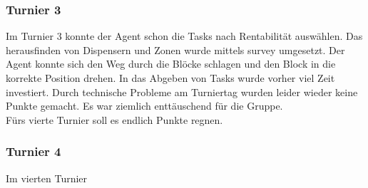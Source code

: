 %
%

\subsubsection{Turnier 3}
Im Turnier 3 konnte der Agent schon die Tasks nach Rentabilität auswählen. Das herausfinden von Dispensern und Zonen wurde mittels survey umgesetzt. Der Agent konnte sich den Weg durch die Blöcke schlagen und den Block in die korrekte Position drehen. In das Abgeben von Tasks wurde vorher viel Zeit investiert. Durch technische Probleme am Turniertag wurden leider wieder keine Punkte gemacht. Es war ziemlich enttäuschend für die Gruppe.\\
Fürs vierte Turnier soll es endlich Punkte regnen.

%
%

\subsubsection{Turnier 4}
Im vierten Turnier


